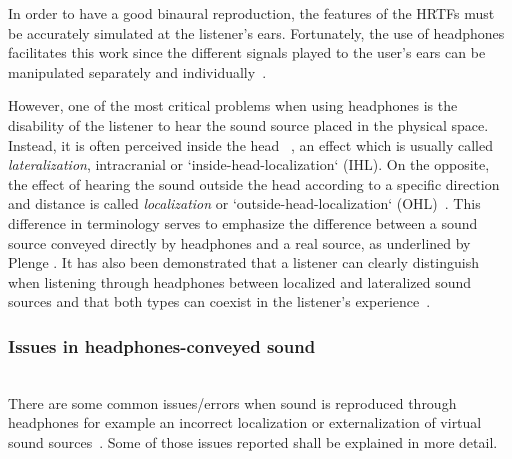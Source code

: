 \documentclass[journal]{IEEEtran}
\begin{document}
In order to have a good binaural reproduction, the features of the HRTFs must be accurately simulated at the listener's ears. Fortunately, the use of headphones facilitates this work since the different signals played to the user's ears can be manipulated separately and individually~\cite{plenge1972}.

However, one of the most critical problems when using headphones is the disability of the listener to hear the sound source placed in the physical space. Instead, it is often perceived inside the head ~\cite{harma2004}, an effect which is usually called \emph{lateralization}, intracranial or `inside-head-localization` (IHL). On the opposite, the effect of hearing the sound outside the head according to a specific direction and distance is called \emph{localization} or `outside-head-localization` (OHL)~\cite{plenge1972}. This difference in terminology serves to emphasize the difference between a sound source conveyed directly by headphones and a real source, as underlined by Plenge \cite{plenge1972}. It has also been demonstrated that a listener can clearly distinguish when listening through headphones between localized and lateralized sound sources and that both types can coexist in the listener's experience~\cite{harma2004}.\\


\subsubsection*{Issues in headphones-conveyed sound}~\\
There are some common issues/errors when sound is reproduced through headphones for example an incorrect localization or externalization of virtual sound sources~\cite{harma2004}. Some of those issues reported shall be explained in more detail.
\end{document}
